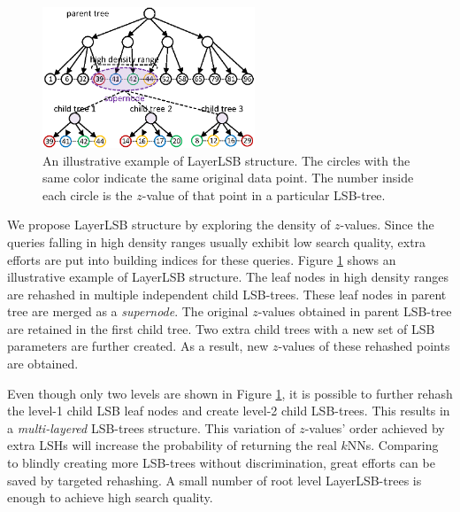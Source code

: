 \begin{figure}[t]
\vspace{-0.1in}
    \centerline{\includegraphics[width=2.5in]{fig/layerlsb.eps}}
    \caption{An illustrative example of LayerLSB structure. The circles with the same color indicate the same original data point. The number inside each circle is the $z$-value of that point in a particular LSB-tree.}
    \label{fig:layerlsb}
\end{figure}

We propose LayerLSB structure by exploring the density of $z$-values. Since the queries falling in high density ranges usually exhibit low search quality, extra efforts are put into building indices for these queries. Figure \ref{fig:layerlsb} shows an illustrative example of LayerLSB structure. The leaf nodes in high density ranges are rehashed in multiple independent child LSB-trees. These leaf nodes in parent tree are merged as a \emph{supernode}. The original $z$-values obtained in parent LSB-tree are retained in the first child tree. Two extra child trees with a new set of LSB parameters are further created. As a result, new $z$-values of these rehashed points are obtained.

Even though only two levels are shown in Figure \ref{fig:layerlsb}, it is possible to further rehash the level-1 child LSB leaf nodes and create level-2 child LSB-trees. This results in a \emph{multi-layered} LSB-trees structure. This variation of $z$-values' order achieved by extra LSHs will increase the probability of returning the real $k$NNs. Comparing to blindly creating more LSB-trees without discrimination, great efforts can be saved by targeted rehashing. A small number of root level LayerLSB-trees is enough to achieve high search quality.
